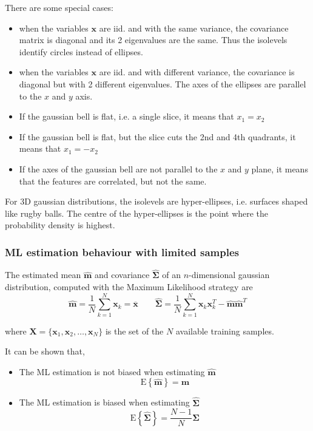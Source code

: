 \documentclass[oneside,onecolumn]{report}
\newcommand{\E}[1]{\text{E} \left\{ #1 \right\}}
\begin{document}
There are some special cases:
\begin{itemize}
    \item when the variables $\bm x$ are iid. and with the same variance, the covariance matrix is diagonal and its 2 eigenvalues are the same. Thus the isolevels identify circles instead of ellipses.
    \item when the variables $\bm x$ are iid. and with different variance, the covariance is diagonal but with 2 different eigenvalues. The axes of the ellipses are parallel to the $x$ and $y$ axis.
    \item If the gaussian bell is flat, i.e. a single slice, it means that $x_1 = x_2$
    \item If the gaussian bell is flat, but the slice cuts the 2nd and 4th quadrants, it means that $x_1 = -x_2$
    \item If the axes of the gaussian bell are not parallel to the $x$ and $y$ plane, it means that the features are correlated, but not the same.
\end{itemize}

For 3D gaussian distributions, the isolevels are hyper-ellipses, i.e. surfaces shaped like rugby balls. The centre of the hyper-ellipses is the point where the probability density is highest.

\subsubsection{ML estimation behaviour with limited samples}
The estimated mean $\widehat{\bm m}$ and covariance $\bm{\widehat \Sigma}$ of an $n$-dimensional gaussian distribution, computed with the Maximum Likelihood strategy are
$$ \widehat{\bm m} = \frac{1}{N} \sum_{k = 1}^N \bm x_k = \overline{\bm x}
\qquad
\bm{\widehat \Sigma} = \frac{1}{N} \sum_{k = 1}^N \bm x_k \bm x_k^T - \widehat{\bm m} \widehat{\bm m}^T $$

where $\bm X = \{\bm x_1, \bm x_2, \dots, \bm x_N\}$ is the set of the $N$ available training samples.

It can be shown that,
\begin{itemize}
    \item The ML estimation is not biased when estimating $\widehat{\bm m}$
    $$ \E{\widehat{\bm m}} = \bm m $$

    \item The ML estimation is biased when estimating $\widehat{\bm \Sigma}$
    $$ \E{\widehat{\bm \Sigma}} = \frac{N - 1}{N} \bm \Sigma $$
\end{itemize}
\end{document}

